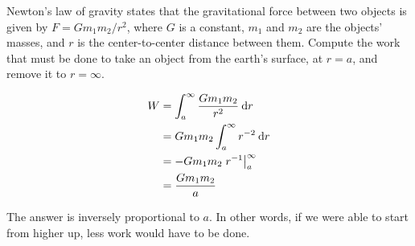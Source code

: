\begin{eg}
\egquestion Newton's law of gravity states that the gravitational force between two objects
is given by $F=Gm_1m_2/r^2$, where $G$ is a constant, $m_1$ and $m_2$ are the objects' masses,
and $r$ is the center-to-center distance between them. Compute the work that must be done
to take an object from the earth's surface, at $r=a$, and remove it to $r=\infty$.

\eganswer
\begin{align*}
  W &= \int_a^\infty \frac{Gm_1m_2}{r^2} \: \textup{d} r \\
    &= Gm_1m_2 \int_a^\infty r^{-2} \: \textup{d} r \\
    &= -Gm_1m_2 \left.r^{-1}\right|_a^\infty  \\
    &= \frac{Gm_1m_2}{a}
\end{align*}

The answer is inversely proportional to $a$. In other words, if we were able to start from
higher up, less work would have to be done.
\end{eg}

